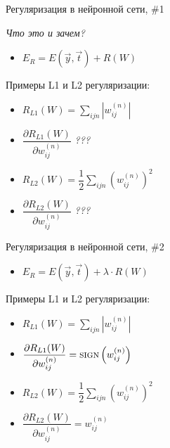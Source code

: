 \documentclass[10pt]{beamer}
\begin{document}
\begin{frame}{Регуляризация в нейронной сети, \#1}

\textit{Что это и зачем?}

\begin{itemize}
	\item $E_{R} = E\left( \vec y, \vec t \right) + R(W)$
\end{itemize}
Примеры L1 и L2 регуляризации:
\begin{itemize}
	\item $R_{L1}(W) = \sum_{ijn} \left| w_{ij}^{(n)} \right|$
	\item $\dfrac{\partial R_{L1}(W)}{\partial w_{ij}^{(n)}}$ \textit{???}
	\item $R_{L2}(W) = \dfrac{1}{2} \sum_{ijn} \left( w_{ij}^{(n)} \right)^2$
	\item $\dfrac{\partial R_{L2}(W)}{\partial w_{ij}^{(n)}}$ \textit{???}
\end{itemize}

\end{frame}



\begin{frame}{Регуляризация в нейронной сети, \#2}

\begin{itemize}
	\item $E_{R} = E\left( \vec y, \vec t \right) + \lambda \cdot R(W)$
\end{itemize}
Примеры L1 и L2 регуляризации:
\begin{itemize}
	\item $R_{L1}(W) = \sum_{ijn} \left| w_{ij}^{(n)} \right|$
	\item $\dfrac{\partial R_{L1}(W)}{\partial w_{ij}^{(n)}} = \textsc{sign}\left(w_{ij}^{(n)}\right)$
	\item $R_{L2}(W) = \dfrac{1}{2} \sum_{ijn} \left( w_{ij}^{(n)} \right)^2$
	\item $\dfrac{\partial R_{L2}(W)}{\partial w_{ij}^{(n)}} = w_{ij}^{(n)}$
\end{itemize}

\end{frame}
\end{document}
